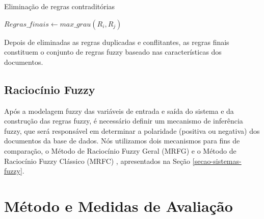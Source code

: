 \documentclass[template.tex]{subfiles}
\begin{document}
\begin{algorithm}
\begin{algorithmic}[1]
\caption{Eliminação de regras contraditórias}
\label{alg-regras-contraditorias}
           \STATE $Regras\_finais \leftarrow max\_grau(R_i,R_j)$
       \ENDIF    
   \ENDFOR
\ENDFOR
\end{algorithmic}
\end{algorithm}


%

Depois de eliminadas as regras duplicadas e conflitantes, as regras finais constituem o conjunto de regras fuzzy baseado nas características dos documentos.

\subsection{Raciocínio Fuzzy}

Após a modelagem fuzzy das variáveis de entrada e saída do sistema e da construção das regras fuzzy, é necessário definir um mecanismo de inferência fuzzy, que será responsável em determinar a polaridade (positiva ou negativa) dos documentos da base de dados. Nós utilizamos dois mecanismos para fins de comparação, o Método de Raciocínio Fuzzy Geral (MRFG) e o Método de Raciocínio Fuzzy Clássico (MRFC) \cite{cordon1999proposal}, apresentados na Seção \ref{secao-sistemas-fuzzy}.

\section{Método e Medidas de Avaliação}
\end{document}
